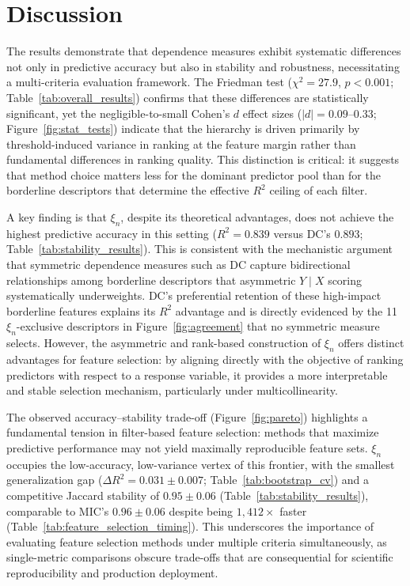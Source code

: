 \documentclass[twoside,11pt]{article}
\begin{document}
\section{Discussion}
The results demonstrate that dependence measures exhibit systematic differences
not only in predictive accuracy but also in stability and robustness,
necessitating a multi-criteria evaluation framework. The Friedman test
($\chi^{2} = 27.9$, $p < 0.001$; Table~\ref{tab:overall_results}) confirms
that these differences are statistically significant, yet the negligible-to-small
Cohen's $d$ effect sizes ($|d| = 0.09$--$0.33$; Figure~\ref{fig:stat_tests})
indicate that the hierarchy is driven primarily by threshold-induced variance in
ranking at the feature margin rather than fundamental differences in ranking
quality. This distinction is critical: it suggests that method choice matters
less for the dominant predictor pool than for the borderline descriptors that
determine the effective $R^2$ ceiling of each filter.

A key finding is that $\xi_n$, despite its theoretical advantages, does not
achieve the highest predictive accuracy in this setting ($R^2 = 0.839$ versus
DC's $0.893$; Table~\ref{tab:stability_results}). This is consistent with the
mechanistic argument that symmetric dependence measures such as DC capture
bidirectional relationships among borderline descriptors that asymmetric
$Y \mid X$ scoring systematically underweights. DC's preferential retention of
these high-impact borderline features explains its $R^2$ advantage and is
directly evidenced by the 11 $\xi_n$-exclusive descriptors in
Figure~\ref{fig:agreement} that no symmetric measure selects. However, the
asymmetric and rank-based construction of $\xi_n$ offers distinct advantages
for feature selection: by aligning directly with the objective of ranking
predictors with respect to a response variable, it provides a more
interpretable and stable selection mechanism, particularly under
multicollinearity.

The observed accuracy--stability trade-off (Figure~\ref{fig:pareto}) highlights
a fundamental tension in filter-based feature selection: methods that maximize
predictive performance may not yield maximally reproducible feature sets.
$\xi_n$ occupies the low-accuracy, low-variance vertex of this frontier, with
the smallest generalization gap ($\Delta R^2 = 0.031 \pm 0.007$;
Table~\ref{tab:bootstrap_cv}) and a competitive Jaccard stability of
$0.95 \pm 0.06$ (Table~\ref{tab:stability_results}), comparable to MIC's
$0.96 \pm 0.06$ despite being $1{,}412\times$ faster
(Table~\ref{tab:feature_selection_timing}). This underscores the importance of
evaluating feature selection methods under multiple criteria simultaneously,
as single-metric comparisons obscure trade-offs that are consequential for
scientific reproducibility and production deployment.
\end{document}
